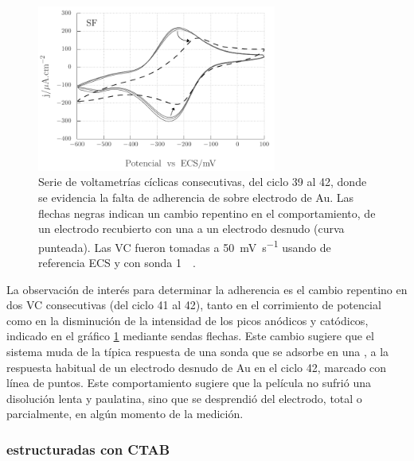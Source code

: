 				\begin{figure}[b!]
				 	   	    \begin{center} 
				        	\includegraphics[width=0.70\textwidth]{Graficos/Adherencia_F127.pdf}
				       		\caption[Adherencia de \pdmF \space sobre una película delgada de Au.]{Serie de voltametrías cíclicas consecutivas, del ciclo 39 al 42, donde se evidencia la falta de adherencia de \pdmF\space sobre electrodo de Au. Las flechas negras indican un cambio repentino en el comportamiento, de un electrodo recubierto con una \pdm\space a un electrodo desnudo (curva punteada). Las VC fueron tomadas a \SI{50}{\milli\volt.\second^{-1}} usando de referencia ECS y con sonda \ru\space \SI{1}{\milli\Molar}.}
				         	\label{fig:adherencia_F127}
				     		\end{center}
				     		\end{figure}

			La observación de interés para determinar la adherencia es el cambio repentino en dos VC consecutivas (del ciclo 41 al 42), tanto en el corrimiento de potencial como en la disminución de la intensidad de los picos anódicos y catódicos, indicado en el gráfico \ref{fig:adherencia_F127} mediante sendas flechas. Este cambio sugiere que el sistema muda de la típica respuesta de una sonda que se adsorbe en una \pdm, a la respuesta habitual de un electrodo desnudo de Au en el ciclo 42, marcado con línea de puntos. Este comportamiento sugiere que la película no sufrió una disolución lenta y paulatina, sino que se desprendió del electrodo, total o parcialmente, en algún momento de la medición.	     		

			\subsubsection*{\pdm\space estructuradas con CTAB}	     		
				     		

